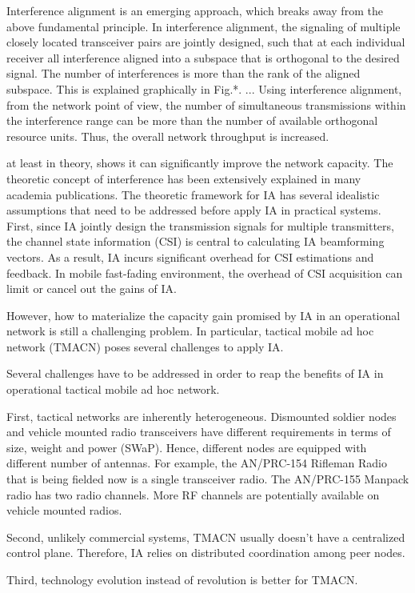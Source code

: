 \documentclass[letterpaper,11pt,onecolumn]{article}
\begin{document}
Interference alignment is an emerging approach, which breaks away from the above fundamental principle. In interference alignment, the signaling of multiple closely located transceiver pairs are jointly designed, such that at each individual receiver all interference aligned into a subspace that is orthogonal to the desired signal. The number of interferences is more than the rank of the aligned subspace. This is explained graphically in Fig.*. ... Using interference alignment, from the network point of view, the number of simultaneous transmissions within the interference range can be more than the number of available orthogonal resource units. Thus, the overall network throughput is increased.


at least in theory, shows it can significantly improve the network capacity. The theoretic concept of interference has been extensively explained in many academia publications. The theoretic framework for IA has several idealistic assumptions that need to be addressed before apply IA in practical systems. First, since IA jointly design the transmission signals for multiple transmitters, the channel state information (CSI) is central to calculating IA beamforming vectors. As a result, IA incurs significant overhead for CSI estimations and feedback. In mobile fast-fading environment, the overhead of CSI acquisition can limit or cancel out the gains of IA. 


However, how to materialize the capacity gain promised by IA in an operational network is still a challenging problem. In particular, tactical mobile ad hoc network (TMACN) poses several challenges to apply IA. 

Several challenges have to be addressed in order to reap the benefits of IA in operational tactical mobile ad hoc network. 

First, tactical networks are inherently heterogeneous. Dismounted soldier nodes and vehicle mounted radio transceivers have different requirements in terms of size, weight and power (SWaP). Hence, different nodes are equipped with different number of antennas. For example, the AN/PRC-154 Rifleman Radio that is being fielded now is a single transceiver radio. The AN/PRC-155 Manpack radio has two radio channels. More RF channels are potentially  available on vehicle mounted radios. 

Second, unlikely commercial systems, TMACN usually doesn't have a centralized control plane. Therefore, IA relies on distributed coordination among peer nodes. 

Third,  technology evolution instead of revolution is better for TMACN.
\end{document}
